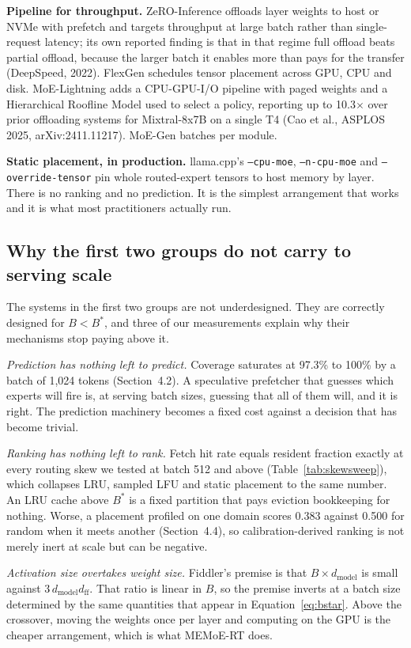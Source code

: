 \textbf{Pipeline for throughput.} ZeRO-Inference offloads layer weights to host
or NVMe with prefetch and targets throughput at large batch rather than
single-request latency; its own reported finding is that in that regime full
offload beats partial offload, because the larger batch it enables more than pays
for the transfer (DeepSpeed, 2022). FlexGen schedules tensor placement across
GPU, CPU and disk. MoE-Lightning adds a CPU-GPU-I/O pipeline with paged weights
and a Hierarchical Roofline Model used to select a policy, reporting up to
10.3$\times$ over prior offloading systems for Mixtral-8x7B on a single T4 (Cao
et al., ASPLOS 2025, arXiv:2411.11217). MoE-Gen batches per module.

\textbf{Static placement, in production.} llama.cpp's \texttt{--cpu-moe},
\texttt{--n-cpu-moe} and \texttt{--override-tensor} pin whole routed-expert
tensors to host memory by layer. There is no ranking and no prediction. It is the
simplest arrangement that works and it is what most practitioners actually run.

\subsection{Why the first two groups do not carry to serving scale}

The systems in the first two groups are not underdesigned. They are correctly
designed for $B < B^{*}$, and three of our measurements explain why their
mechanisms stop paying above it.

\emph{Prediction has nothing left to predict.} Coverage saturates at 97.3\% to
100\% by a batch of 1{,}024 tokens (Section~4.2). A speculative prefetcher that
guesses which experts will fire is, at serving batch sizes, guessing that all of
them will, and it is right. The prediction machinery becomes a fixed cost against
a decision that has become trivial.

\emph{Ranking has nothing left to rank.} Fetch hit rate equals resident fraction
exactly at every routing skew we tested at batch 512 and above
(Table~\ref{tab:skewsweep}), which collapses LRU, sampled LFU and static
placement to the same number. An LRU cache above $B^{*}$ is a fixed partition
that pays eviction bookkeeping for nothing. Worse, a placement profiled on one
domain scores 0.383 against 0.500 for random when it meets another
(Section~4.4), so calibration-derived ranking is not merely inert at scale but
can be negative.

\emph{Activation size overtakes weight size.} Fiddler's premise is that
$B \times d_{\text{model}}$ is small against $3 \, d_{\text{model}}
d_{\text{ff}}$. That ratio is linear in $B$, so the premise inverts at a batch
size determined by the same quantities that appear in Equation~\ref{eq:bstar}.
Above the crossover, moving the weights once per layer and computing on the GPU
is the cheaper arrangement, which is what MEMoE-RT does.

